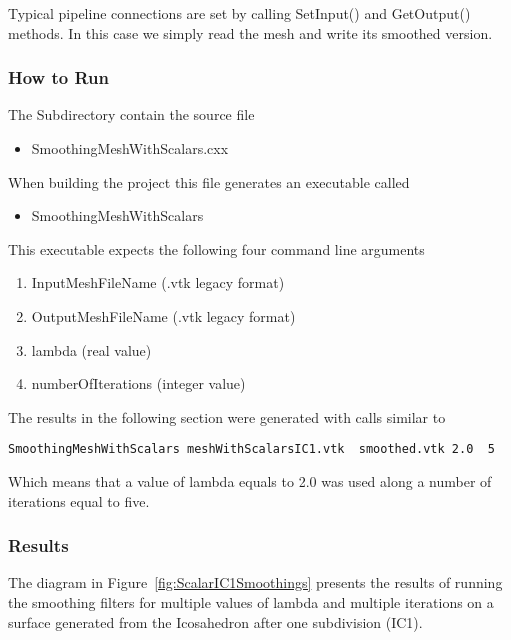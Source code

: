 \documentclass{InsightArticle}
\begin{document}
Typical pipeline connections are set by calling SetInput() and GetOutput() methods.
In this case we simply read the mesh and write its smoothed version.

\begin{center}

\end{center}

\subsubsection{How to Run}

The Subdirectory  contain the source file 

\begin{itemize}
\item SmoothingMeshWithScalars.cxx
\end{itemize}

When building the project this file generates an executable called

\begin{itemize}
\item SmoothingMeshWithScalars
\end{itemize}

This executable expects the following four command line arguments

\begin{enumerate}
\item InputMeshFileName (.vtk legacy format)
\item OutputMeshFileName (.vtk legacy format)
\item lambda (real value)
\item numberOfIterations (integer value)
\end{enumerate}

The results in the following section were generated with calls similar to

\begin{verbatim}
SmoothingMeshWithScalars meshWithScalarsIC1.vtk  smoothed.vtk 2.0  5
\end{verbatim}

Which means that a value of lambda equals to 2.0 was used along a number of
iterations equal to five.

\subsubsection{Results}

The diagram in Figure~\ref{fig:ScalarIC1Smoothings} presents the results of
running the smoothing filters for multiple values of lambda and multiple
iterations on a surface generated from the Icosahedron after one subdivision
(IC1).
\end{document}
